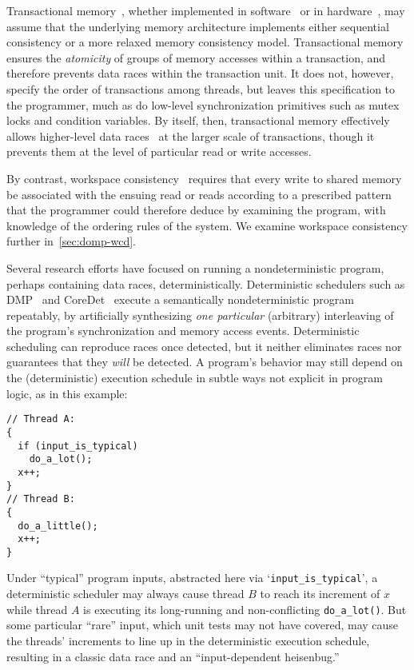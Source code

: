 Transactional memory~\cite{harris10tm}, whether implemented in 
software~\cite{dolev08carSTM,	herlihy03stm} or in
hardware~\cite{herlihy93transactional}, may assume that the underlying memory architecture implements either sequential consistency or a more relaxed memory consistency model.  Transactional memory
ensures the \textit{atomicity} of groups of memory accesses within a transaction, and therefore prevents data races within the transaction unit.  It does not, however, specify the order of transactions among threads, but leaves this specification to the programmer, much as do low-level synchronization primitives such as mutex locks and condition variables.  By itself, then, transactional memory effectively allows higher-level data races~\cite{artho03high} at the larger scale of transactions, though it prevents them at the level of particular read or write accesses.

By contrast, workspace consistency~\cite{aviram11workspace} requires that every write to shared memory be associated with the ensuing read or reads according to a prescribed pattern that the programmer could therefore deduce by examining the program, with knowledge of the ordering rules of the system.  We examine workspace consistency further in~\ref{sec:domp-wcd}.

Several research efforts have focused on running a nondeterministic program, perhaps containing data races, deterministically.  Deterministic schedulers such as DMP~\cite{devietti09dmp} and CoreDet~\cite{bergan10coredet} execute a semantically nondeterministic program repeatably, by artificially synthesizing {\em one particular} (arbitrary) interleaving of the program's synchronization and memory access events.  Deterministic scheduling can reproduce races once detected, but it neither eliminates races nor guarantees that they {\em will} be detected.  A program's behavior may still depend on the (deterministic) execution schedule in subtle ways not explicit in program logic, as in this example:
%
\begin{small}
\begin{verbatim}
// Thread A:
{
  if (input_is_typical)
    do_a_lot();
  x++;
}
// Thread B: 
{
  do_a_little();
  x++;
}    
\end{verbatim}
\end{small}
%
Under ``typical'' program inputs, abstracted here via `\verb|input_is_typical|', a deterministic scheduler may always cause thread $B$ to reach its increment of $x$ while thread $A$ is executing its long-running and non-conflicting \verb|do_a_lot()|.  But some particular ``rare'' input, which unit tests may not have covered, may cause the threads' increments to line up in the deterministic execution schedule, resulting in a classic data race and an ``input-dependent heisenbug.''

